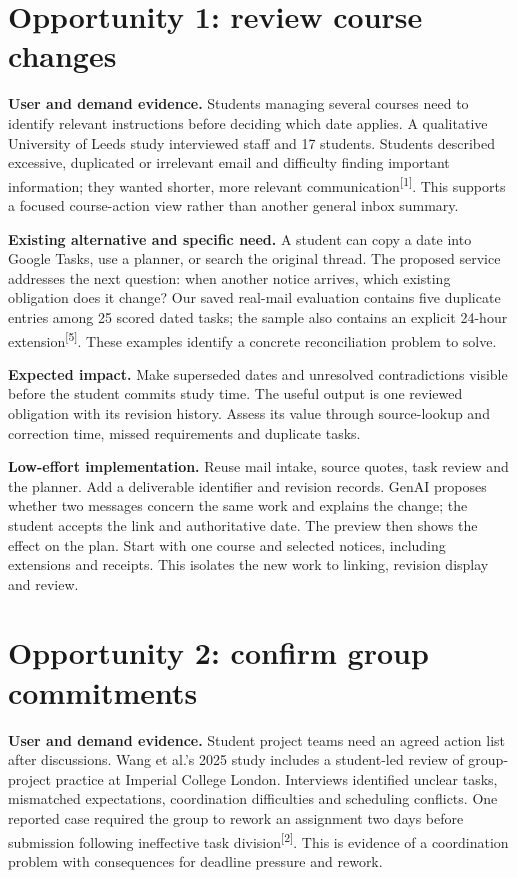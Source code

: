\documentclass[11pt,a4paper]{article}
\newcommand{\src}[1]{\textsuperscript{[#1]}}
\begin{document}
\section{Opportunity 1: review course changes}
\textbf{User and demand evidence.} Students managing several courses need to
identify relevant instructions before deciding which date applies. A qualitative
University of Leeds study interviewed staff and 17 students. Students described
excessive, duplicated or irrelevant email and difficulty finding important
information; they wanted shorter, more relevant communication\src{1}. This
supports a focused course-action view rather than another general inbox summary.

\textbf{Existing alternative and specific need.} A student can copy a date into
Google Tasks, use a planner, or search the original thread. The proposed service
addresses the next question: when another notice arrives, which existing
obligation does it change? Our saved real-mail evaluation contains five duplicate
entries among 25 scored dated tasks; the sample also contains an explicit
24-hour extension\src{5}. These examples identify a concrete reconciliation
problem to solve.

\textbf{Expected impact.} Make superseded dates and unresolved contradictions
visible before the student commits study time. The useful output is one reviewed
obligation with its revision history. Assess its value through source-lookup
and correction time, missed requirements and duplicate tasks.

\textbf{Low-effort implementation.} Reuse mail intake, source quotes, task review
and the planner. Add a deliverable identifier and revision records. GenAI proposes
whether two messages concern the same work and explains the change; the student
accepts the link and authoritative date. The preview then shows the effect on
the plan. Start with one course and selected notices, including extensions and
receipts. This isolates the new work to linking, revision display and review.

\clearpage
\section{Opportunity 2: confirm group commitments}
\textbf{User and demand evidence.} Student project teams need an agreed action
list after discussions. Wang et al.'s 2025 study includes a student-led review of
group-project practice at Imperial College London. Interviews identified unclear
tasks, mismatched expectations, coordination difficulties and scheduling
conflicts. One reported case required the group to rework an assignment two days
before submission following ineffective task division\src{2}. This is evidence
of a coordination problem with consequences for deadline pressure and rework.
\end{document}
